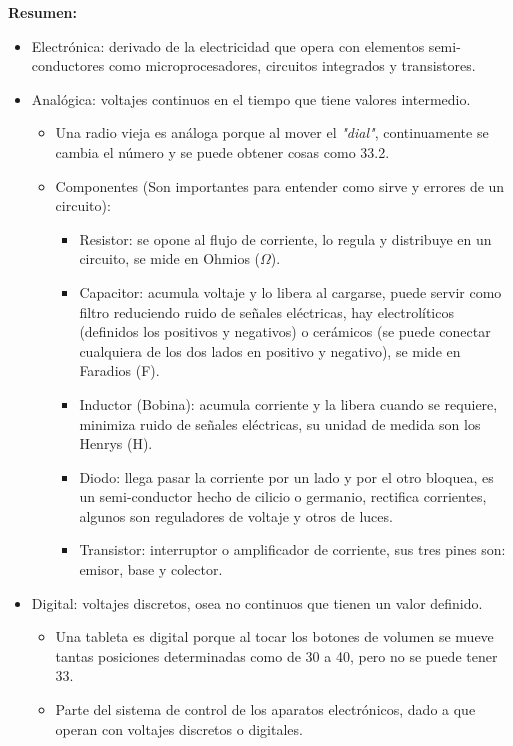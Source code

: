 \documentclass[stu, 12pt, letterpaper, donotrepeattitle, floatsintext, natbib, helv]{apa7}
\begin{document}
\noindent \textbf{Resumen:}
\begin{itemize}
    \item Electrónica: derivado de la electricidad que opera con elementos semi-conductores como microprocesadores, circuitos integrados y transistores.
    \item Analógica: voltajes continuos en el tiempo que tiene valores intermedio.
    \begin{itemize}
        \item Una radio vieja es análoga porque al mover el \textit{"dial"}, continuamente se cambia el número y se puede obtener cosas como 33.2.
        \item Componentes (Son importantes para entender como sirve y errores de un circuito):
        \begin {itemize}
            \item Resistor: se opone al flujo de corriente, lo regula y distribuye en un circuito, se mide en Ohmios ($\Omega$).
            \item Capacitor: acumula voltaje y lo libera al cargarse, puede servir como filtro reduciendo ruido de señales eléctricas, hay electrolíticos (definidos los positivos y negativos) o cerámicos (se puede conectar cualquiera de los dos lados en positivo y negativo), se mide en Faradios (F).
            \item Inductor (Bobina): acumula corriente y la libera cuando se requiere, minimiza ruido de señales eléctricas, su unidad de medida son los Henrys (H).
            \item Diodo: llega pasar la corriente por un lado y por el otro bloquea, es un semi-conductor hecho de cilicio o germanio, rectifica corrientes, algunos son reguladores de voltaje y otros de luces.
            \item Transistor: interruptor o amplificador de corriente, sus tres pines son: emisor, base y colector. 
        \end{itemize}
    \end{itemize}
    \item Digital: voltajes discretos, osea no continuos que tienen un valor definido.
    \begin{itemize}
        \item Una tableta es digital porque al tocar los botones de volumen se mueve tantas posiciones determinadas como de 30 a 40, pero no se puede tener 33.
        \item Parte del sistema de control de los aparatos electrónicos, dado a que operan con voltajes discretos o digitales.

\end{itemize}
\end{itemize}
\end{document}
